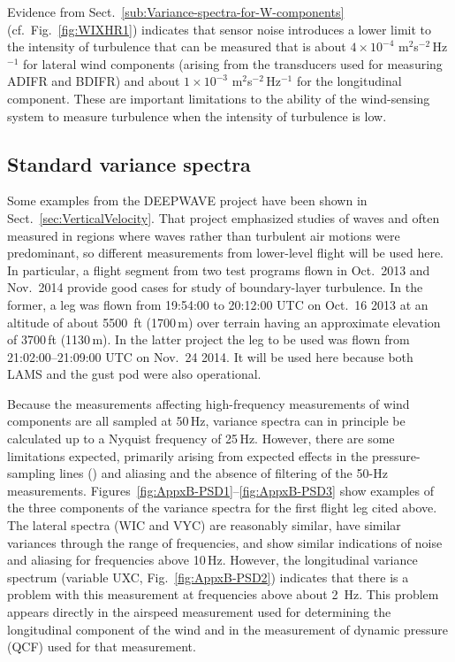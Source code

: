 \documentclass[12pt,twoside,english]{article}\usepackage[]{graphicx}\usepackage[]{color}
\let\OrgIndex\index
\renewcommand*{\index}[1]{\OrgIndex{#1}}
\begin{document}
{{\begin{appendices}
Evidence from Sect.~\ref{sub:Variance-spectra-for-W-components} (cf.~Fig.~\ref{fig:WIXHR1}) indicates that sensor noise introduces a lower limit to the intensity of turbulence that can be measured that is about $4\times10^{-4}$ m$^{2}$s$^{-2}$\,Hz$^{-1}$ for lateral wind components (arising from the transducers used for measuring ADIFR and BDIFR) and about $1\times10^{-3}$ m$^{2}$s$^{-2}$\,Hz$^{-1}$ for the longitudinal component. These are important limitations to the ability of the wind-sensing system to measure turbulence when the intensity of turbulence is low. 


\subsection{Standard variance spectra\label{sub:var-spec}}

Some examples from the DEEPWAVE project have been shown in Sect.~\ref{sec:VerticalVelocity}. That project emphasized studies of waves and often measured in regions where waves rather than turbulent air motions were predominant, so different measurements from lower-level flight will be used here. In particular, a flight segment from two test programs flown in Oct.~2013 and Nov.~2014 provide good cases for study of boundary-layer turbulence. In the former, a leg was flown from 19:54:00 to 20:12:00 UTC on Oct.~16 2013 at an altitude of about 5500~ft (1700\,m) over terrain having an approximate elevation of 3700\,ft (1130\,m). In the latter project the leg to be used was flown from 21:02:00--21:09:00 UTC on Nov.~24 2014. It will be used here because both LAMS and the gust pod were also operational. 



Because the measurements affecting high-frequency measurements of wind components are all sampled at 50\,Hz, variance spectra can in principle be calculated up to a Nyquist frequency of 25\,Hz. However, there are some limitations expected, primarily arising from expected effects in the pressure-sampling lines (\citet{Iberall1950}) and aliasing and the absence of filtering of the 50-Hz measurements. Figures\ \ref{fig:AppxB-PSD1}--\ref{fig:AppxB-PSD3} show examples of the three components of the variance spectra for the first flight leg cited above. The lateral spectra (WIC and VYC) are reasonably similar, have similar variances through the range of frequencies, and show similar indications of noise and aliasing for frequencies above 10\,Hz. However, the longitudinal variance spectrum (variable UXC, Fig.~\ref{fig:AppxB-PSD2}) indicates that there is a problem with this measurement at frequencies above about 2~Hz. This problem appears directly in the airspeed measurement used for determining the longitudinal component of the wind and in the measurement of dynamic pressure (QCF) used for that measurement. 


\end{appendices}}}
\end{document}

